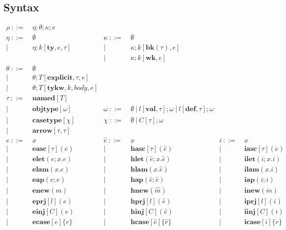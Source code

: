 \documentclass[letterpaper, notitlepage]{article}
\begin{document}
\subsection{Syntax}
\[
\begin{array}{rlrlrl}
	\rho		~::=&~ \eta;\theta;\kappa;e\\
	\eta		~::=&~ \emptyset						& \kappa 		~::=&~\emptyset\\
				|~ 	& ~ \eta;k[\mathbf{ty},e,\tau]		& 				| ~ &~ \kappa;k[\mathbf{bk}(\tau),e]\\
					&									& 				| ~ &~ \kappa;k[\mathbf{wk},e]\\
	\theta		~::=&~ \emptyset\\
				|~ 	&~ \theta; T[\mathbf{explicit}, \tau, e]\\
				|~ 	&~ \theta; T[\mathbf{tykw}, k, body, e]\\
	\tau 		~::=&~ \mathbf{named}[T]\\
				|~	& ~ \mathbf{objtype}[\omega]		& \omega 		~::=&~ 	\emptyset ~ | ~ l[\mathbf{val}, \tau];\omega ~ | ~ l[\mathbf{def}, \tau];\omega\\
				|~	& ~ \mathbf{casetype}[\chi]			& \chi 			~::=&~	\emptyset ~ | ~	C[\tau];\omega\\
				|~  & ~ \mathbf{arrow}[\tau, \tau]\\
	e 			~::=&~ x 								&\hat{e}	~::=&~ 	x 										& i 		~::=&~ 	x\\
				| ~ &~ \mathbf{easc}[\tau](e)			& 		 	| ~ &~ 	\mathbf{hasc}[\tau](\hat{e})			& 		 	| ~ &~	\mathbf{iasc}[\tau](\dot{e})\\
				| ~ &~ \mathbf{elet}(e; x.e)     		& 		 	| ~ &~ 	\mathbf{hlet}(\hat{e}; x.\hat{e})		& 		 	| ~ &~	\mathbf{ilet}(i;x.i)\\
				| ~ &~ \mathbf{elam}(x.e)     			& 		 	| ~ &~ 	\mathbf{hlam}(x.\hat{e})				& 		 	| ~ &~	\mathbf{ilam}(x.i)\\
				| ~ &~ \mathbf{eap}(e;e)     			& 		 	| ~ &~ 	\mathbf{hap}(\hat{e};\hat{e})			& 		 	| ~ &~	\mathbf{iap}(i;i)\\
				| ~ &~ \mathbf{enew}(m)     			& 		 	| ~ &~	\mathbf{hnew}(\hat{m})					& 		 	| ~ &~	\mathbf{inew}(\dot{m})\\
				| ~ &~ \mathbf{eprj}[l](e)     			& 		 	| ~ &~	\mathbf{hprj}[l](\hat{e})				& 		 	| ~ &~	\mathbf{iprj}[l](i)\\
				| ~ &~ \mathbf{einj}[C](e)     			& 		 	| ~ &~	\mathbf{hinj}[C](\hat{e})				& 		 	| ~ &~	\mathbf{iinj}[C](i)\\
				| ~ &~ \mathbf{ecase}[e]\{r\}     		& 		 	| ~ &~	\mathbf{hcase}[\hat{e}]\{\hat{r}\}		& 		 	| ~ &~	\mathbf{icase}[i]\{\dot{r}\}\\

\end{array}\]
\end{document}
